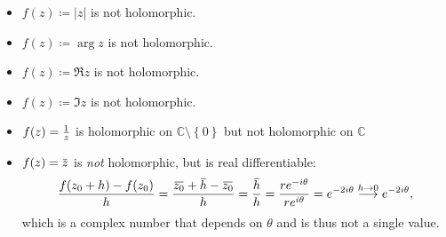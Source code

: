 \begin{example}

\envlist

\begin{itemize}
\tightlist
\item
  \(f(z) \coloneqq{\left\lvert {z} \right\rvert}\) is not holomorphic.
\item
  \(f(z) \coloneqq\arg{z}\) is not holomorphic.
\item
  \(f(z) \coloneqq\Re{z}\) is not holomorphic.
\item
  \(f(z) \coloneqq\Im{z}\) is not holomorphic.
\item
  \(f(z) = {1\over z}\) is holomorphic on
  \({\mathbb{C}}\setminus\left\{{0}\right\}\) but not holomorphic on
  \({\mathbb{C}}\)
\item
  \(f(z) = \mkern 1.5mu\overline{\mkern-1.5muz\mkern-1.5mu}\mkern 1.5mu\)
  is \emph{not} holomorphic, but is real differentiable:
  \begin{align*}
  {f(z_0 + h) - f(z_0) \over h } = {\mkern 1.5mu\overline{\mkern-1.5muz_0\mkern-1.5mu}\mkern 1.5mu + \mkern 1.5mu\overline{\mkern-1.5muh\mkern-1.5mu}\mkern 1.5mu - \mkern 1.5mu\overline{\mkern-1.5muz_0\mkern-1.5mu}\mkern 1.5mu \over h} = {\mkern 1.5mu\overline{\mkern-1.5muh\mkern-1.5mu}\mkern 1.5mu \over h} = {re^{-i\theta} \over re^{i\theta}} = e^{-2i\theta} \overset{h\to 0}\longrightarrow e^{-2i\theta}
  ,\end{align*}
  which is a complex number that depends on \(\theta\) and is thus not a
  single value.
\end{itemize}

\end{example}

